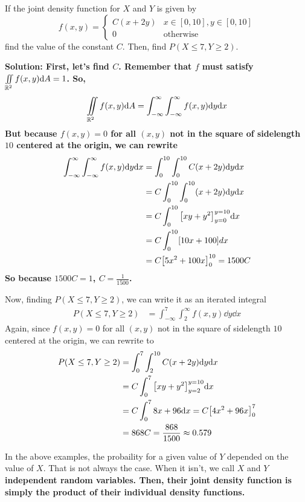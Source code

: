 \begin{example}
    If the joint density function for \(X\) and \(Y\) is given by 
    \[ f(x,y) = \begin{cases}
        C(x+2y) & x\in [0, 10], y\in[0, 10] \\
        0 & \text{otherwise}
    \end{cases}\]
    find the value of the constant $C$. Then, find $P(X\leq 7, Y\geq 2)$.\par
    \bf{Solution: }First, let's find $C$. Remember that $f$ must satisfy $\iint\limits_{\mathbb{R}^2}f(x,y)\dd A = 1$. So,
    \begin{align*}
        \iint\limits_{\mathbb{R}^2}f(x,y)\dd A = \int_{-\infty}^\infty\int_{-\infty}^{\infty}f(x,y)\dd y\dd x
    \end{align*}
    But because $f(x,y) = 0$ for all $(x,y)$ not in the square of sidelength $10$ centered at the origin, we can rewrite
    \begin{align*}
        \int_{-\infty}^\infty\int_{-\infty}^{\infty}f(x,y)\dd y\dd x &= \int_{0}^{10}\int_{0}^{10}C(x+2y)\dd y\dd x \\
        &= C\int_{0}^{10}\int_{0}^{10}(x+2y)\dd y\dd x \\
        &= C \int_0^{10} \bqty{xy+y^2}_{y=0}^{y=10}\dd x\\
        &= C\int_0^{10} [10x+100]dx \\
        &= C\bqty{5x^2+100x}_0^{10} = 1500C
    \end{align*}
    So because $1500C=1$, $C=\frac{1}{1500}$.\par
    Now, finding $P(X\leq 7, Y\geq 2)$, we can write it as an iterated integral
    \begin{align*}
        P(X\leq 7, Y\geq 2) &= \int_{-\infty}^{7}\int_{2}^\infty f(x,y)\dd y\dd x
    \end{align*}
    Again, since $f(x,y) = 0$ for all $(x,y)$ not in the square of sidelength $10$ centered at the origin, we can rewrite to
    \begin{align*}
        P(X\leq 7, Y\geq 2) &= \int_{0}^{7}\int_{2}^{10} C(x+2y)\dd y\dd x \\
        &= C\int_0^7 \bqty{xy+y^2}_{y=2}^{y=10}\dd x\\
        &= C\int_0^7 8x+96\dd x = C\bqty{4x^2+96x}_0^7 \\
        &= 868C = \frac{868}{1500} \approx 0.579
    \end{align*}
\end{example}
In the above examples, the probaility for a given value of $Y$ depended on the value of $X$. That is not always the case. When it isn't, we call $X$ and $Y$ \bf{independent random variables}. Then, their joint density function is simply the product of their individual density functions.
